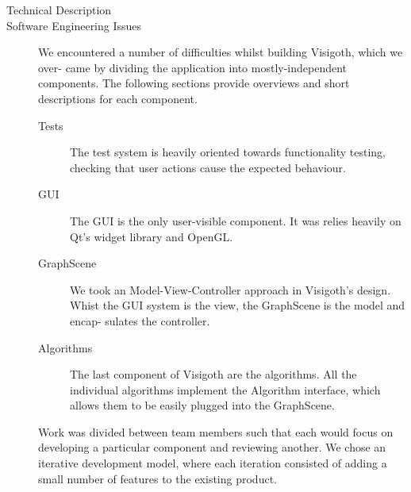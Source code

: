 \documentclass[a4paper,11pt,titlepage]{article}
\begin{document}
\begin{description}
	\item[Technical Description]

	\item[Software Engineering Issues]

    We encountered a number of difficulties whilst building Visigoth, which we
    over- came by dividing the application into mostly-independent components.
    The following sections provide overviews and short descriptions for each
    component.

    \begin{description}
      \item[Tests] The test system is heavily oriented towards functionality
        testing, checking that user actions cause the expected behaviour.

      \item[GUI] The GUI is the only user-visible component. It was relies
        heavily on Qt's widget library and OpenGL.

      \item[GraphScene] We took an Model-View-Controller approach in Visigoth's
        design. Whist the GUI system is the view, the GraphScene is the model
        and encap- sulates the controller.

      \item[Algorithms] The last component of Visigoth are the algorithms. All
        the individual algorithms implement the Algorithm interface, which
        allows them to be easily plugged into the GraphScene.
    \end{description}

    Work was divided between team members such that each would focus on
    developing a particular component and reviewing another. We chose an
    iterative development model, where each iteration consisted of adding a
    small number of features to the existing product.


\end{description}
\end{document}
